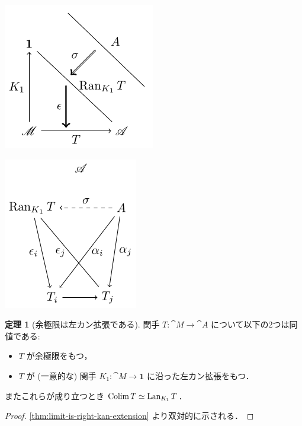 \documentclass[titlepage]{ltjsreport}
\theoremstyle{definition}
\newtheorem{theorem}{定理}[chapter]
\begin{document}
\begin{center}
  \begin{minipage}[b]{0.4\linewidth}
    \includegraphics{src/lim-right-kan-1}
  \end{minipage}
  \begin{minipage}[b]{0.4\linewidth}
    \includegraphics{src/lim-right-kan-2}
  \end{minipage}
\end{center}

\begin{theorem}[余極限は左カン拡張である]
  関手 $T:\cat{M}\to\cat{A}$ について以下の2つは同値である:
  \begin{itemize}
    \item $T$ が余極限をもつ，
    \item $T$ が (一意的な) 関手 $K_1:\cat{M}\to\mathbf{1}$
          に沿った左カン拡張をもつ．
  \end{itemize}
  またこれらが成り立つとき $\operatorname{Colim} T\simeq\operatorname{Lan}_{K_1}T$．
\end{theorem}

\begin{proof}
  \cref{thm:limit-is-right-kan-extension} より双対的に示される．
\end{proof}
\end{document}

